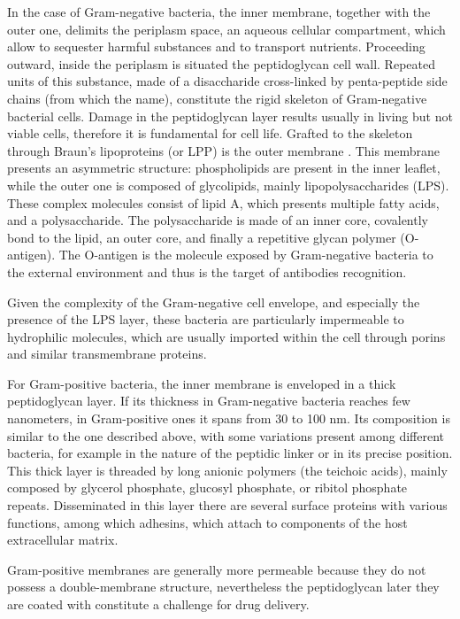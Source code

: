 In the case of Gram-negative bacteria, the inner membrane, together with the outer one, delimits the periplasm space, an aqueous cellular compartment, which allow to sequester harmful substances and to transport nutrients.
%
Proceeding outward, inside the periplasm is situated the peptidoglycan cell wall. Repeated units of this substance, made of a disaccharide cross-linked by penta-peptide side chains (from which the name), constitute the rigid skeleton of Gram-negative bacterial cells. Damage in the peptidoglycan layer results usually in living but not viable cells, therefore it is fundamental for cell life.
%
Grafted to the skeleton through Braun’s lipoproteins (or LPP) is the outer membrane \cite{Asmar2018}. This membrane presents an asymmetric structure: phospholipids are present in the inner leaflet, while the outer one is composed of glycolipids, mainly lipopolysaccharides (LPS). These complex molecules consist of lipid A, which presents multiple fatty acids, and a polysaccharide. The polysaccharide is made of an inner core, covalently bond to the lipid, an outer core, and finally a repetitive glycan polymer (O-antigen). The O-antigen is the molecule exposed by Gram-negative bacteria to the external environment and thus is the target of antibodies recognition. 

Given the complexity of the Gram-negative cell envelope, and especially the presence of the LPS layer, these bacteria are particularly impermeable to hydrophilic molecules, which are usually imported within the cell through porins and similar transmembrane proteins.

For Gram-positive bacteria, 
the inner membrane is enveloped in a thick peptidoglycan layer. If its thickness in Gram-negative bacteria reaches few nanometers, in Gram-positive ones it spans from 30 to 100 nm. Its composition is similar to the one described above, with some variations present among different bacteria, for example in the nature of the peptidic linker or in its precise position. This thick layer is threaded by long anionic polymers (the teichoic acids), mainly composed by glycerol phosphate, glucosyl phosphate, or ribitol phosphate repeats. Disseminated in this layer there are several surface proteins with various functions, among which adhesins, which attach to components of the host extracellular matrix.

Gram-positive membranes are generally more permeable because they do not possess a double-membrane structure, nevertheless the peptidoglycan later they are coated with constitute a challenge for drug delivery.


